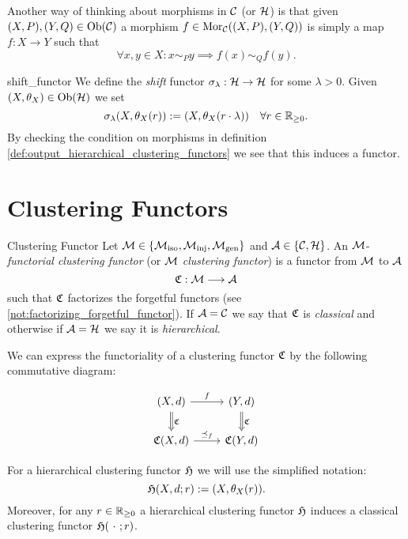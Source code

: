 Another way of thinking about morphisms in $\mathcal{C}$ (or $\mathcal{H}$) is that given $(X,P), (Y,Q) \in \mathrm {Ob}(\mathcal{C})$ a morphism $f \in \mathrm {Mor}_{\mathcal{C}}((X,P), (Y,Q))$ is simply a map $f: X \to Y$ such that
$$
\forall x,y \in X: x \sim_P y \implies f(x) \sim_Q f(y).
$$

\begin{definition}{}{shift_functor}
We define the \emph{shift} functor $\sigma_\lambda: \mathcal{H} \to \mathcal{H}$ for some $\lambda > 0$. Given $(X, \theta_X) \in \mathrm {Ob}(\mathcal{H})$ we set
$$
\sigma_\lambda(X, \theta_X(r)) := (X, \theta_X(r \cdot \lambda)) \quad \forall r \in \mathbb R_{\geq0}.
$$
By checking the condition on morphisms in definition \ref{def:output_hierarchical_clustering_functors} we see that this induces a functor.

\end{definition}

\section{Clustering Functors}
\begin{definition}{Clustering Functor \cite[Sec.~4.1]{Carlsson2010}}{}
Let $\mathcal{M} \in \{{\mathcal{M}_\mathrm{iso}}, {\mathcal{M}_\mathrm{inj}}, {\mathcal{M}_\mathrm{gen}}\}$ and $\mathcal{A} \in \{\mathcal{C}, \mathcal{H}\}$. An $\mathcal{M}$-\emph{functorial clustering functor} (or $\mathcal{M}$ \emph{clustering functor}) is a functor from $\mathcal{M}$ to $\mathcal{A}$
$$\mathfrak{C} : \mathcal{M} \longrightarrow \mathcal{A}$$
such that $\mathfrak{C}$ factorizes the forgetful functors (see \ref{not:factorizing_forgetful_functor}). If $\mathcal{A} = \mathcal{C}$ we say that $\mathfrak{C}$ is \emph{classical} and otherwise if $\mathcal{A} = \mathcal{H}$ we say it is \emph{hierarchical}.
\end{definition}

We can express the functoriality of a clustering functor $\mathfrak{C}$ by the following commutative diagram:

\begin{equation*}
    \begin{tikzcd}
    {(X,d)} \arrow[r, "f"] \arrow[d, "\Cf", Rightarrow] & {(Y,d)} \arrow[d, "\Cf", Rightarrow] \\
    {\Cf(X,d)} \arrow[r, "\refines_f"]                  & {\Cf(Y,d)}
    \end{tikzcd}
\end{equation*}

For a hierarchical clustering functor $\mathfrak{H}$ we will use the simplified notation:
$$
\mathfrak{H}(X,d;r) := (X,\theta_X(r)).
$$
Moreover, for any $r \in \mathbb R_{\geq0}$ a hierarchical clustering functor $\mathfrak{H}$ induces a classical clustering functor $\Hf(\ \cdot \ ;r)$.

